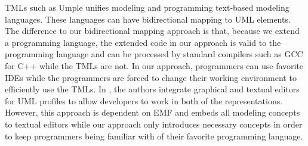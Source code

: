 \noindent
{} TMLs \cite{mazanec2012general} such as Umple \cite{lethbridge2010umplification} unifies modeling and programming text-based modeling languages.
These languages can have bidirectional mapping to UML elements.
The difference to our bidirectional mapping approach is that, because we extend a programming language, the extended code in our approach is valid to the programming language and can be processed by standard compilers such as GCC for C++ while the TMLs are not.
In our approach, programmers can use favorite IDEs while the programmers are forced to change their working environment to efficiently use the TMLs.
In \cite{Maro:2015:IGT:2814251.2814253}, the authors integrate graphical and textual editors for UML profiles to allow developers to work in both of the representations.
However, this approach is dependent on EMF and embeds all modeling concepts to textual editors while our approach only introduces necessary concepts in order to keep programmers being familiar with of their favorite programming language.


